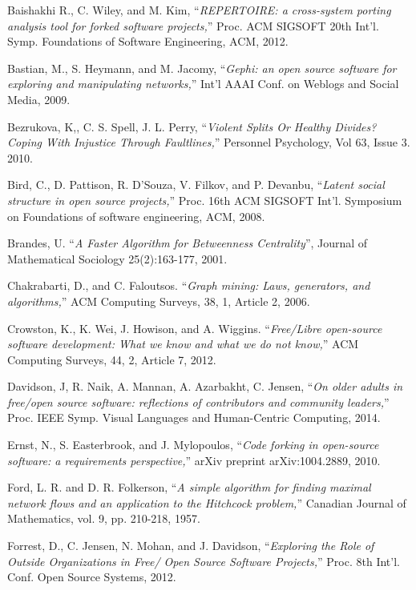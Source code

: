 \begin{thebibliography}{99.}
 Baishakhi R., C. Wiley, and M. Kim, ``\textit{REPERTOIRE: a cross-system porting analysis tool for forked software projects,}'' Proc. ACM SIGSOFT 20th Int'l. Symp. Foundations of Software Engineering, ACM, 2012.

 Bastian, M., S. Heymann, and M. Jacomy, ``\textit{Gephi: an open source software for exploring and manipulating networks,}'' Int'l AAAI Conf. on Weblogs and Social Media, 2009.

 Bezrukova, K,, C. S. Spell, J. L. Perry, ``\textit{Violent Splits Or Healthy Divides? Coping With Injustice Through Faultlines,}'' Personnel Psychology, Vol 63, Issue 3. 2010. 

 Bird, C., D. Pattison, R. D'Souza, V. Filkov, and P. Devanbu, ``\textit{Latent social structure in open source projects,}'' Proc. 16th ACM SIGSOFT Int'l. Symposium on Foundations of software engineering, ACM, 2008.  

 Brandes, U. ``\textit{A Faster Algorithm for Betweenness Centrality}'', Journal of Mathematical Sociology 25(2):163-177, 2001.

 Chakrabarti,  D., and C. Faloutsos. ``\textit{Graph mining: Laws, generators, and algorithms,}'' ACM Computing Surveys, 38, 1, Article 2, 2006.

Crowston, K., K. Wei, J. Howison, and A. Wiggins. ``\textit{Free/Libre open-source software development: What we know and what we do not know,}'' ACM Computing Surveys, 44, 2, Article 7, 2012.

 Davidson, J, R. Naik, A. Mannan, A. Azarbakht, C. Jensen, ``\textit{On older adults in free/open source software: reflections of contributors and community leaders,}'' Proc. IEEE Symp. Visual Languages and Human-Centric Computing, 2014.

 Ernst, N., S. Easterbrook, and J. Mylopoulos, ``\textit{Code forking in open-source software: a requirements perspective,}'' arXiv preprint arXiv:1004.2889, 2010.

 Ford, L. R. and D. R. Folkerson, ``\textit{A simple algorithm for finding maximal network flows and an application to the Hitchcock problem,}'' Canadian Journal of Mathematics, vol. 9, pp. 210-218, 1957. 

 Forrest, D., C. Jensen, N. Mohan, and J. Davidson, ``\textit{Exploring the Role of Outside Organizations in Free/ Open Source Software Projects,}'' Proc. 8th Int'l. Conf. Open Source Systems, 2012.


\end{thebibliography}
